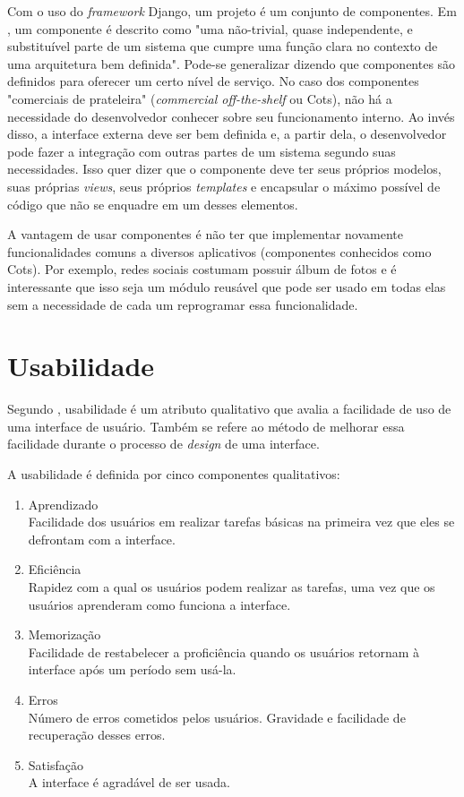     Com o uso do \textit{framework} Django, um projeto é um conjunto de componentes. Em , um componente é descrito como "uma não-trivial, quase independente, e substituível parte de um sistema que cumpre uma função clara no contexto de uma arquitetura bem definida". Pode-se generalizar dizendo que componentes são definidos para oferecer um certo nível de serviço. No caso dos componentes "comerciais de prateleira" (\textit{commercial off-the-shelf} ou Cots), não há a necessidade do desenvolvedor conhecer sobre seu funcionamento interno. Ao invés disso, a interface externa deve ser bem definida e, a partir dela, o desenvolvedor pode fazer a integração com outras partes de um sistema segundo suas necessidades. Isso quer dizer que o componente deve ter seus próprios modelos, suas próprias \textit{views}, seus próprios \textit{templates} e encapsular o máximo possível de código que não se enquadre em um desses elementos.

A vantagem de usar componentes é não ter que implementar novamente funcionalidades comuns a diversos aplicativos (componentes conhecidos como Cots). Por exemplo, redes sociais costumam possuir álbum de fotos e é interessante que isso seja um módulo reusável que pode ser usado em todas elas sem a necessidade de cada um reprogramar essa funcionalidade.

\section{Usabilidade}

Segundo , usabilidade é um atributo qualitativo que avalia a facilidade de uso de uma interface de usuário. Também se refere ao método de melhorar essa facilidade durante o processo de \textit{design} de uma interface.

A usabilidade é definida por cinco componentes qualitativos:
    \begin{enumerate}
        \item Aprendizado \\
            Facilidade dos usuários em realizar tarefas básicas na primeira vez que eles se defrontam com a interface.
        \item Eficiência \\
            Rapidez com a qual os usuários podem realizar as tarefas, uma vez que os usuários aprenderam como funciona a interface.
        \item Memorização \\
            Facilidade de restabelecer a proficiência quando os usuários retornam à interface após um período sem usá-la.
        \item Erros \\
            Número de erros cometidos pelos usuários. Gravidade e facilidade de recuperação desses erros.
        \item Satisfação \\
            A interface é agradável de ser usada.
    \end{enumerate}

